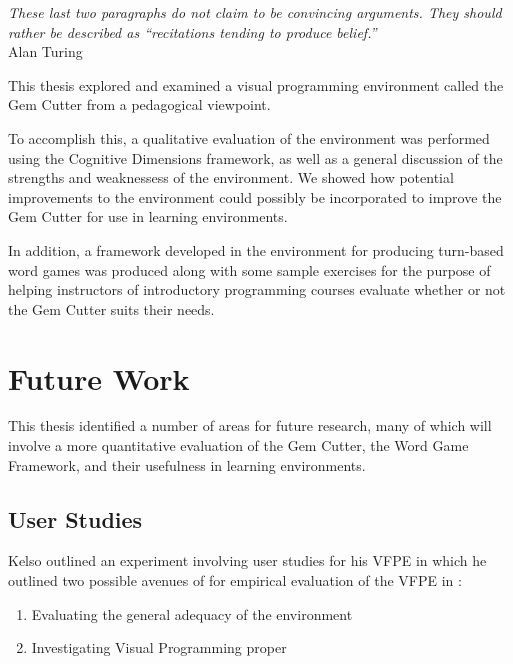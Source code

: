 \label{concl}

\begin{flushright}
\textit{These last two paragraphs do not claim to be convincing arguments. They should rather be described as ``recitations tending to produce belief.''}
\\
Alan Turing \cite{Turing50} \\
\end{flushright}

This thesis explored and examined a visual programming environment called the Gem Cutter from a pedagogical viewpoint.  

To accomplish this, a qualitative evaluation of the environment was performed using the Cognitive Dimensions framework, as well as a general discussion of the strengths and weaknessess of the environment.  We showed how potential improvements to the environment could possibly be incorporated to improve the Gem Cutter for use in learning environments. 

In addition, a framework developed in the environment for producing turn-based word games was produced along with some sample exercises for the purpose of helping instructors of introductory programming courses evaluate whether or not the Gem Cutter suits their needs.

\section{Future Work}

This thesis identified a number of areas for future research, many of which will involve a more quantitative evaluation of the Gem Cutter, the Word Game Framework, and their usefulness in learning environments.

\subsection{User Studies}

Kelso outlined an experiment involving user studies for his VFPE in which he outlined two possible avenues of for empirical evaluation of the VFPE in \cite{Kelso02}:

\begin{enumerate}
	\item Evaluating the general adequacy of the environment
	\item Investigating Visual Programming proper
\end{enumerate}

